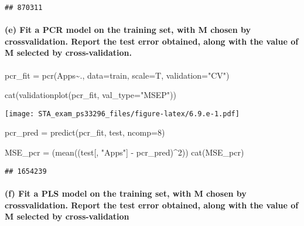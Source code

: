 \documentclass[
]{article}
\newenvironment{Shaded}{\begin{snugshade}}{\end{snugshade}}
\newcommand{\AttributeTok}[1]{\textcolor[rgb]{0.77,0.63,0.00}{#1}}
\newcommand{\DecValTok}[1]{\textcolor[rgb]{0.00,0.00,0.81}{#1}}
\newcommand{\FunctionTok}[1]{\textcolor[rgb]{0.00,0.00,0.00}{#1}}
\newcommand{\NormalTok}[1]{#1}
\newcommand{\OtherTok}[1]{\textcolor[rgb]{0.56,0.35,0.01}{#1}}
\newcommand{\SpecialCharTok}[1]{\textcolor[rgb]{0.00,0.00,0.00}{#1}}
\newcommand{\StringTok}[1]{\textcolor[rgb]{0.31,0.60,0.02}{#1}}
\begin{document}
\begin{verbatim}
## 870311
\end{verbatim}

\hypertarget{e-fit-a-pcr-model-on-the-training-set-with-m-chosen-by-crossvalidation.-report-the-test-error-obtained-along-with-the-value-of-m-selected-by-cross-validation.}{%
\paragraph{(e) Fit a PCR model on the training set, with M chosen by
crossvalidation. Report the test error obtained, along with the value of
M selected by
cross-validation.}\label{e-fit-a-pcr-model-on-the-training-set-with-m-chosen-by-crossvalidation.-report-the-test-error-obtained-along-with-the-value-of-m-selected-by-cross-validation.}}

\begin{Shaded}
\begin{Highlighting}[]
\NormalTok{pcr\_fit }\OtherTok{=} \FunctionTok{pcr}\NormalTok{(Apps}\SpecialCharTok{\textasciitilde{}}\NormalTok{., }\AttributeTok{data=}\NormalTok{train, }\AttributeTok{scale=}\NormalTok{T, }\AttributeTok{validation=}\StringTok{"CV"}\NormalTok{)}

\FunctionTok{cat}\NormalTok{(}\FunctionTok{validationplot}\NormalTok{(pcr\_fit, }\AttributeTok{val\_type=}\StringTok{"MSEP"}\NormalTok{))}
\end{Highlighting}
\end{Shaded}

\texttt{[image: STA\_exam\_ps33296\_files/figure-latex/6.9.e-1.pdf]}

\begin{Shaded}
\begin{Highlighting}[]
\NormalTok{pcr\_pred }\OtherTok{=} \FunctionTok{predict}\NormalTok{(pcr\_fit, test, }\AttributeTok{ncomp=}\DecValTok{8}\NormalTok{)}

\NormalTok{MSE\_pcr }\OtherTok{=}\NormalTok{ (}\FunctionTok{mean}\NormalTok{((test[, }\StringTok{"Apps"}\NormalTok{] }\SpecialCharTok{{-}}\NormalTok{ pcr\_pred)}\SpecialCharTok{\^{}}\DecValTok{2}\NormalTok{))}
\FunctionTok{cat}\NormalTok{(MSE\_pcr)}
\end{Highlighting}
\end{Shaded}

\begin{verbatim}
## 1654239
\end{verbatim}

\hypertarget{f-fit-a-pls-model-on-the-training-set-with-m-chosen-by-crossvalidation.-report-the-test-error-obtained-along-with-the-value-of-m-selected-by-cross-validation}{%
\paragraph{(f) Fit a PLS model on the training set, with M chosen by
crossvalidation. Report the test error obtained, along with the value of
M selected by
cross-validation}\label{f-fit-a-pls-model-on-the-training-set-with-m-chosen-by-crossvalidation.-report-the-test-error-obtained-along-with-the-value-of-m-selected-by-cross-validation}}
\end{document}
